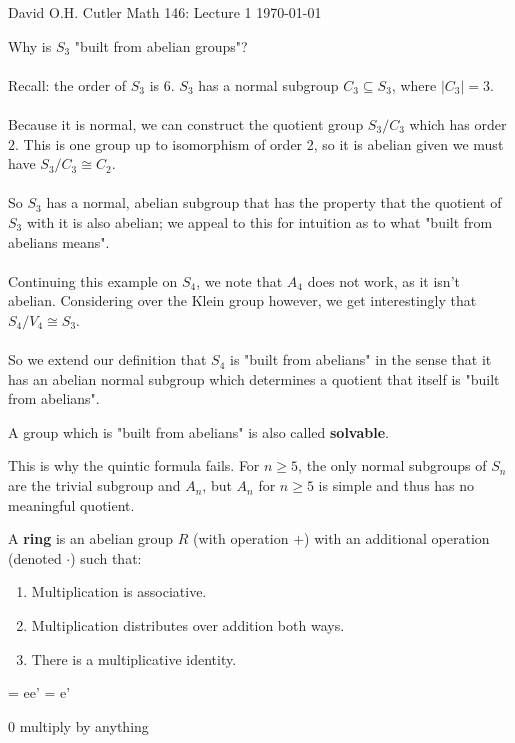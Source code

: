 \documentclass[12pt]{article}
\newenvironment{lemma}[2][Lemma]{\begin{trivlist}
    \item[\hskip \labelsep {\bfseries #1}\hskip \labelsep {\bfseries #2.}]}{\end{trivlist}}
\newenvironment{definition}[2][Definition]{\begin{trivlist}
    \item[\hskip \labelsep {\bfseries #1}\hskip \labelsep {\bfseries #2.}]}{\end{trivlist}}
\newenvironment{example}[1][Example]{\begin{trivlist}
    \item[\hskip \labelsep {\bfseries #1:}]}{\end{trivlist}}
\begin{document}
\noindent David O.H. Cutler \hfill {\Large Math 146: Lecture 1} \hfill \today

\begin{example}
    Why is $S_3$ "built from abelian groups"? \\ \\
    Recall: the order of $S_3$ is $6$. $S_3$ has a normal subgroup $C_3 \subseteq S_3$, where $|C_3| = 3$. \\ \\
    Because it is normal, we can construct the quotient group $S_3 / C_3$ which has order $2$. This is one group up to isomorphism of order 2, so it is abelian given we must have $S_3 / C_3 \cong C_2$. \\ \\
    So $S_3$ has a normal, abelian subgroup that has the property that the quotient of $S_3$ with it is also abelian; we appeal to this for intuition as to what "built from abelians means". \\ \\
    Continuing this example on $S_4$, we note that $A_4$ does not work, as it isn't abelian. Considering over the Klein group however, we get interestingly that $S_4 / V_4 \cong S_3$. \\ \\
    So we extend our definition that $S_4$ is "built from abelians" in the sense that it has an abelian normal subgroup which determines a quotient that itself is "built from abelians".
\end{example}

\begin{definition}{(Solvable)}
    A group which is "built from abelians" is also called \textbf{solvable}.
\end{definition}

\begin{example}
    This is why the quintic formula fails. For $n \geq 5$, the only normal subgroups of $S_n$ are the trivial subgroup and $A_n$, but $A_n$ for $n \geq 5$ is simple and thus has no meaningful quotient.
\end{example}

\begin{definition}{(Ring)}
    A \textbf{ring} is an abelian group $R$ (with operation $+$) with an additional operation (denoted $\cdot$) such that:
    \begin{enumerate}[label=(\alph*)]
        \item Multiplication is associative.
        \item Multiplication distributes over addition both ways.
        \item There is a multiplicative identity. 
    \end{enumerate}
\end{definition}

\begin{lemma}
    e = ee' = e' 

    0 multiply by anything
\end{lemma}
\end{document}
